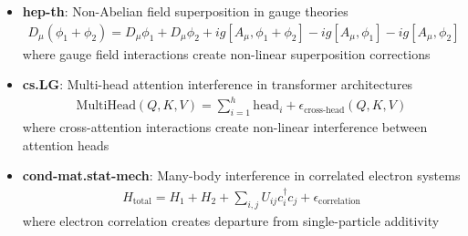 \begin{theorem}
\begin{itemize}
\item \textbf{hep-th}: Non-Abelian field superposition in gauge theories
  \begin{align}
  D_\mu(\phi_1 + \phi_2) = D_\mu \phi_1 + D_\mu \phi_2 + ig[A_\mu, \phi_1 + \phi_2] - ig[A_\mu, \phi_1] - ig[A_\mu, \phi_2]
  \end{align}
  where gauge field interactions create non-linear superposition corrections
  
\item \textbf{cs.LG}: Multi-head attention interference in transformer architectures
  \begin{align}
  \text{MultiHead}(Q, K, V) = \sum_{i=1}^h \text{head}_i + \epsilon_{\text{cross-head}}(Q, K, V)
  \end{align}
  where cross-attention interactions create non-linear interference between attention heads
  
\item \textbf{cond-mat.stat-mech}: Many-body interference in correlated electron systems
  \begin{align}
  H_{\text{total}} = H_1 + H_2 + \sum_{i,j} U_{ij} c_i^\dagger c_j + \epsilon_{\text{correlation}}
  \end{align}
  where electron correlation creates departure from single-particle additivity
\end{itemize}
\end{theorem}

